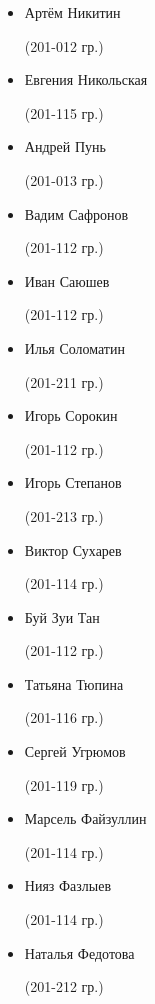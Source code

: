 \begin{multicols}{2}
\begin{small}
\begin{itemize}
	\item[] Артём Никитин\begin{tiny} (201-012 гр.)\end{tiny}
	\item[] Евгения Никольская\begin{tiny} (201-115 гр.)\end{tiny}
	\item[] Андрей Пунь\begin{tiny} (201-013 гр.)\end{tiny}
	\item[] Вадим Сафронов\begin{tiny} (201-112 гр.)\end{tiny}
	\item[] Иван Саюшев\begin{tiny} (201-112 гр.)\end{tiny}
	\item[] Илья Соломатин\begin{tiny} (201-211 гр.)\end{tiny}
	\item[] Игорь Сорокин\begin{tiny} (201-112 гр.)\end{tiny}
	\item[] Игорь Степанов\begin{tiny} (201-213 гр.)\end{tiny}
	\item[] Виктор Сухарев\begin{tiny} (201-114 гр.)\end{tiny}
	\item[] Буй Зуи Тан\begin{tiny} (201-112 гр.)\end{tiny}
	\item[] Татьяна Тюпина\begin{tiny} (201-116 гр.)\end{tiny}
	\item[] Сергей Угрюмов\begin{tiny} (201-119 гр.)\end{tiny}
	\item[] Марсель Файзуллин\begin{tiny} (201-114 гр.)\end{tiny}
	\item[] Нияз Фазлыев\begin{tiny} (201-114 гр.)\end{tiny}
	\item[] Наталья Федотова\begin{tiny} (201-212 гр.)\end{tiny}

\end{itemize}
\end{small}
\end{multicols}
